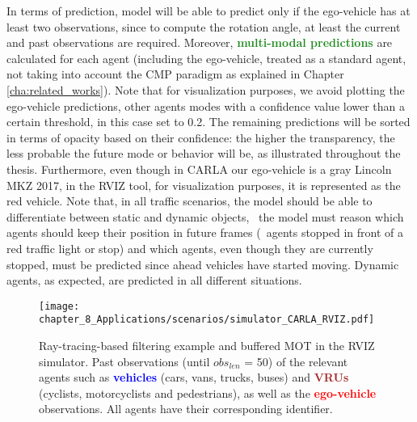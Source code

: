 In terms of prediction, model will be able to predict only if the ego-vehicle has at least two observations, since to compute the rotation angle, at least the current and past observations are required. Moreover, \textbf{\textcolor{ForestGreen}{multi-modal predictions}} are calculated for each agent (including the ego-vehicle, treated as a standard agent, not taking into account the \ac{CMP} paradigm as explained in Chapter \ref{cha:related_works}). Note that for visualization purposes, we avoid plotting the ego-vehicle predictions, other agents modes with a confidence value lower than a certain threshold, in this case set to 0.2. The remaining predictions will be sorted in terms of opacity based on their confidence: the higher the transparency, the less probable the future mode or behavior will be, as illustrated throughout the thesis. Furthermore, even though in \ac{CARLA} our ego-vehicle is a gray Lincoln MKZ 2017, in the \ac{RVIZ} tool, for visualization purposes, it is represented as the red vehicle. Note that, in all traffic scenarios, the model should be able to differentiate between static and dynamic objects, \ie \ the model must reason which agents should keep their position in future frames (\eg \ agents stopped in front of a red traffic light or stop) and which agents, even though they are currently stopped, must be predicted since ahead vehicles have started moving. Dynamic agents, as expected, are predicted in all different situations. 

\begin{figure}[!h]
	\centering
	\texttt{[image: chapter\_8\_Applications/scenarios/simulator\_CARLA\_RVIZ.pdf]}
	\captionsetup{justification=justified}
	\caption[Ray-tracing-based filtering and buffered \ac{MOT} example in the \ac{RVIZ} simulator]{Ray-tracing-based filtering example and buffered \ac{MOT} in the \ac{RVIZ} simulator. Past observations (until \textit{$obs_{len}$} = 50) of the relevant agents such as \textbf{\textcolor{blue}{vehicles}} (cars, vans, trucks, buses) and \textbf{\textcolor{brown}{VRUs}} (cyclists, motorcyclists and pedestrians), as well as the \textbf{\textcolor{red}{ego-vehicle}} observations. All agents have their corresponding identifier.}
	\label{fig:chapter_8_Applications/use_cases/simulator_CARLA_RVIZ}
\end{figure}

